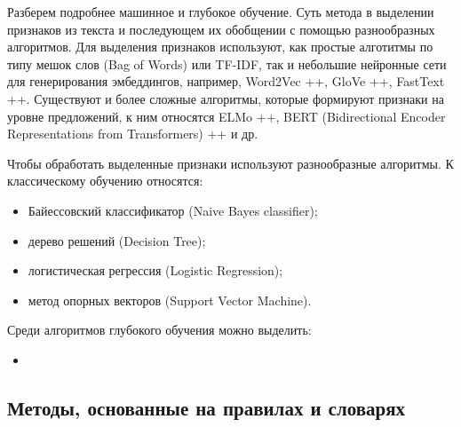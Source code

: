 \bigskip\par
Разберем подробнее машинное и глубокое обучение. Суть метода в выделении признаков из текста и последующем их обобщении с помощью разнообразных алгоритмов. Для выделения признаков используют, как простые алготитмы по типу мешок слов (Bag of Words) или TF-IDF, так и небольшие нейронные сети для генерирования эмбеддингов, например, Word2Vec ++, GloVe ++, FastText ++. Существуют и более сложные алгоритмы, которые формируют признаки на уровне предложений, к ним относятся ELMo ++, BERT (Bidirectional Encoder Representations from Transformers) ++ и др.

\bigskip\par
Чтобы обработать выделенные признаки используют разнообразные алгоритмы. К классическому обучению относятся:
\bigskip
\begin{itemize}
 \item Байессовский классификатор (Naive Bayes classifier);
 \item дерево решений (Decision Tree);
 \item логистическая регрессия (Logistic Regression);
 \item метод опорных векторов (Support Vector Machine).
\end{itemize}

\bigskip\par
Среди алгоритмов глубокого обучения можно выделить:
\begin{itemize}
 \item
\end{itemize}


\subsection{Методы, основанные на правилах и словарях}












































